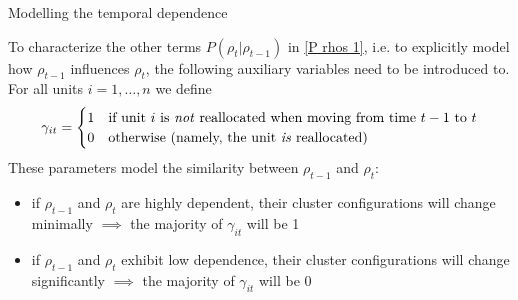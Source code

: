 \documentclass[
	11pt, %
 xcolor={dvipsnames,svgnames}
]{beamer}
\let\cite\citep
\begin{document}
\begin{frame}{Modelling the temporal dependence}
    
To characterize the other terms $P(\rho_t|\rho_{t-1})$ in \eqref{P rhos 1}, i.e. to explicitly model how $\rho_{t-1}$ influences $\rho_t$, the following auxiliary variables need to be introduced to. For all units $i=1,\ldots,n$ we define
\begin{equation*}
\gamma_{it} = \begin{cases}
    1 & \text{if unit $i$ is \emph{not} reallocated when moving from time $t-1$ to $t$} \\
    0 & \text{otherwise (namely, the unit \emph{is} reallocated)}
\end{cases}
\end{equation*}
These parameters model the similarity between $\rho_{t-1}$ and $\rho_t$: 
\begin{itemize}
    \item if $\rho_{t-1}$ and $\rho_{t}$ are highly dependent, their cluster configurations will change minimally $\implies$ the majority of $\gamma_{it}$ will be 1
    \item if $\rho_{t-1}$ and $\rho_{t}$ exhibit low dependence, their cluster configurations will change significantly $\implies$ the majority of $\gamma_{it}$ will be 0
\end{itemize}
\end{frame}
\end{document}
